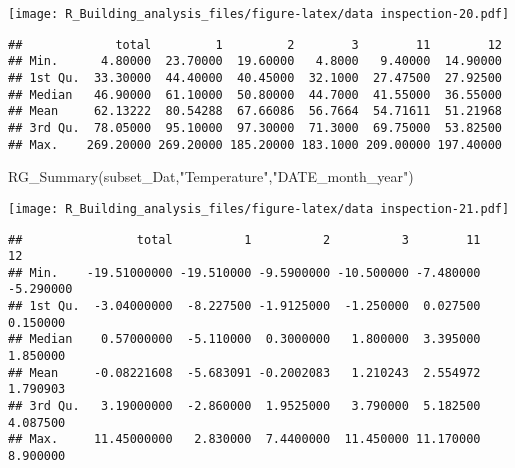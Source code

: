 \documentclass[
]{article}
\newenvironment{Shaded}{\begin{snugshade}}{\end{snugshade}}
\newcommand{\CommentTok}[1]{\textcolor[rgb]{0.56,0.35,0.01}{\textit{#1}}}
\newcommand{\DecValTok}[1]{\textcolor[rgb]{0.00,0.00,0.81}{#1}}
\newcommand{\FunctionTok}[1]{\textcolor[rgb]{0.00,0.00,0.00}{#1}}
\newcommand{\NormalTok}[1]{#1}
\newcommand{\OtherTok}[1]{\textcolor[rgb]{0.56,0.35,0.01}{#1}}
\newcommand{\SpecialCharTok}[1]{\textcolor[rgb]{0.00,0.00,0.00}{#1}}
\newcommand{\StringTok}[1]{\textcolor[rgb]{0.31,0.60,0.02}{#1}}
\begin{document}
\begin{Shaded}
\end{Shaded}

\texttt{[image: R\_Building\_analysis\_files/figure-latex/data inspection-20.pdf]}

\begin{verbatim}
##             total         1         2        3        11        12
## Min.      4.80000  23.70000  19.60000   4.8000   9.40000  14.90000
## 1st Qu.  33.30000  44.40000  40.45000  32.1000  27.47500  27.92500
## Median   46.90000  61.10000  50.80000  44.7000  41.55000  36.55000
## Mean     62.13222  80.54288  67.66086  56.7664  54.71611  51.21968
## 3rd Qu.  78.05000  95.10000  97.30000  71.3000  69.75000  53.82500
## Max.    269.20000 269.20000 185.20000 183.1000 209.00000 197.40000
\end{verbatim}

\begin{Shaded}
\begin{Highlighting}[]
  \FunctionTok{RG\_Summary}\NormalTok{(subset\_Dat,}\StringTok{"Temperature"}\NormalTok{,}\StringTok{"DATE\_month\_year"}\NormalTok{)}
\end{Highlighting}
\end{Shaded}

\texttt{[image: R\_Building\_analysis\_files/figure-latex/data inspection-21.pdf]}

\begin{verbatim}
##                total          1          2          3        11        12
## Min.    -19.51000000 -19.510000 -9.5900000 -10.500000 -7.480000 -5.290000
## 1st Qu.  -3.04000000  -8.227500 -1.9125000  -1.250000  0.027500  0.150000
## Median    0.57000000  -5.110000  0.3000000   1.800000  3.395000  1.850000
## Mean     -0.08221608  -5.683091 -0.2002083   1.210243  2.554972  1.790903
## 3rd Qu.   3.19000000  -2.860000  1.9525000   3.790000  5.182500  4.087500
## Max.     11.45000000   2.830000  7.4400000  11.450000 11.170000  8.900000
\end{verbatim}
\end{document}
